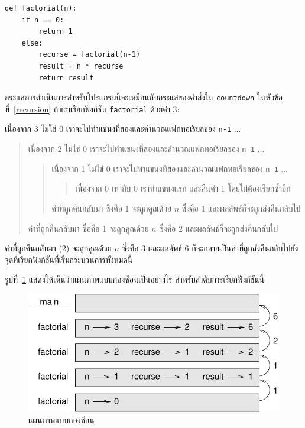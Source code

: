 \begin{verbatim}
def factorial(n):
    if n == 0:
        return 1
    else:
        recurse = factorial(n-1)
        result = n * recurse
        return result
\end{verbatim}
%
กระแสการดำเนินการสำหรับโปรแกรมนี้จะเหมือนกับกระแสของคำสั่งใน {\tt countdown} ในหัวข้อที่~\ref{recursion} 
ถ้าเราเรียกฟังก์ชัน {\tt factorial} ด้วยค่า 3:

เนื่องจาก 3 ไม่ใช่ 0 เราจะไปทำแขนงที่สองและคำนวณแฟกทอเรียลของ {\tt n-1} ...

\begin{quote}
เนื่องจาก 2 ไม่ใช่ 0 เราจะไปทำแขนงที่สองและคำนวณแฟกทอเรียลของ {\tt n-1} ...

  \begin{quote}
  เนื่องจาก 1 ไม่ใช่ 0 เราจะไปทำแขนงที่สองและคำนวณแฟกทอเรียลของ {\tt n-1} ...

    \begin{quote}
    เนื่องจาก 0 เท่ากับ 0 เราทำแขนงแรก และคืนค่า 1 โดยไม่ต้องเรียกซ้ำอีก
    \end{quote}

  ค่าที่ถูกคืนกลับมา ซึ่งคือ 1 จะถูกคูณด้วย {\scriptsize$n$} ซึ่งคือ 1 และผลลัพธ์ก็จะถูกส่งคืนกลับไป
  \end{quote}

ค่าที่ถูกคืนกลับมา ซึ่อคือ 1 จะถูกคูณด้วย {\scriptsize$n$} ซึ่งคือ 2 
และผลลัพธ์ก็จะถูกส่งคืนกลับไป
\end{quote}

ค่าที่ถูกคืนกลับมา (2) จะถูกคูณด้วย {\scriptsize$n$} ซึ่งคือ 3 และผลลัพธ์ 6 ก็จะกลายเป็นค่าที่ถูกส่งคืนกลับไปยังจุดที่เรียกฟังก์ชันที่เริ่มกระบวนการทั้งหมดนี้

รูปที่~\ref{fig.stack3} แสดงให้เห็นว่าแผนภาพแบบกองซ้อนเป็นอย่างไร สำหรับลำดับการเรียกฟังก์ชันนี้

\begin{figure}
\centerline
{\includegraphics[scale=0.8]{figs/stack3.pdf}}
\caption{แผนภาพแบบกองซ้อน}
\label{fig.stack3}
\end{figure}

